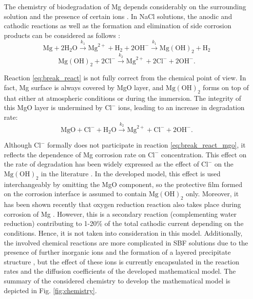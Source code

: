 The chemistry of biodegradation of Mg depends considerably on the surrounding solution and the presence of certain ions \cite{Mei2020}. In NaCl solutions, the anodic and cathodic reactions as well as the formation and elimination of side corrosion products can be considered as follows \cite{Zheng2014}:
\begin{equation} \label{eq:oxidation_react}
\mathrm{Mg}+2 \mathrm{H}_{2} \mathrm{O} \stackrel{k_{1}}{\rightarrow} \mathrm{Mg}^{2+}+\mathrm{H}_{2}+2 \mathrm{OH}^{-} \stackrel{k_{1}}{\rightarrow} \mathrm{Mg}(\mathrm{OH})_{2}+\mathrm{H}_{2}
\end{equation}
\begin{equation} \label{eq:break_react}
\mathrm{Mg}(\mathrm{OH})_{2}+2 \mathrm{Cl}^{-} \stackrel{k_{2}}{\rightarrow} \mathrm{Mg}^{2+}+2 \mathrm{Cl}^{-}+2 \mathrm{OH}^{-}.
\end{equation}

Reaction \ref{eq:break_react} is not fully correct from the chemical point of view. In fact, Mg surface is always covered by MgO layer, and $\mathrm{Mg}(\mathrm{OH})_{2}$ forms on top of that either at atmospheric conditions or during the immersion. The integrity of this MgO layer is undermined by $\mathrm{Cl}^{-}$ ions, leading to an increase in degradation rate:
\begin{equation} \label{eq:break_react_mgo}
\mathrm{MgO}+ \mathrm{Cl}^{-} + \mathrm{H}_{2} \mathrm{O} \stackrel{k_{2}}{\rightarrow} \mathrm{Mg}^{2+}+ \mathrm{Cl}^{-}+ 2\mathrm{OH}^{-}.
\end{equation}

Although $\mathrm{Cl}^{-}$ formally does not participate in reaction \ref{eq:break_react_mgo}, it reflects the dependence of Mg corrosion rate on $\mathrm{Cl}^{-}$ concentration. This effect on the rate of degradation has been widely expressed as the effect of $\mathrm{Cl}^{-}$ on the $\mathrm{Mg}(\mathrm{OH})_{2}$ in the literature \cite{Zheng2014,Zhao2017}. In the developed model, this effect is used interchangeably by omitting the MgO component, so the protective film formed on the corrosion interface is assumed to contain $\mathrm{Mg}(\mathrm{OH})_{2}$ only. Moreover, it has been shown recently that oxygen reduction reaction also takes place during corrosion of Mg \cite{Wang2020,Strebl2020,Silva2018}. However, this is a secondary reaction (complementing water reduction) contributing to 1-20\% of the total cathodic current depending on the conditions. Hence, it is not taken into consideration in this model.  Additionally, the involved chemical reactions are more complicated in {SBF} solutions due to the presence of further inorganic ions and the formation of a layered precipitate structure  \cite{Mei2020}, but the effect of these ions is currently encapsulated in the reaction rates and the diffusion  coefficients of the developed mathematical model. The summary of the considered chemistry to develop the mathematical model is depicted in Fig. \ref{fig:chemistry}.


